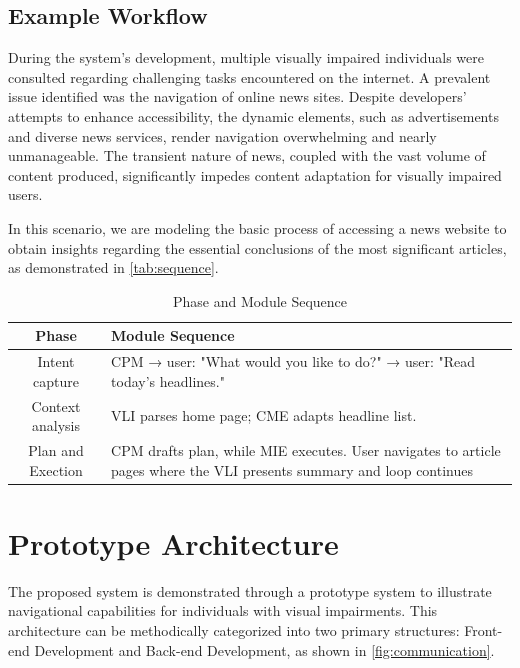 \documentclass[conference]{IEEEtran}
\begin{document}
\subsection*{Example Workflow}

During the system's development, multiple visually impaired individuals were consulted regarding challenging tasks encountered on the internet. A prevalent issue identified was the navigation of online news sites. Despite developers' attempts to enhance accessibility, the dynamic elements, such as advertisements and diverse news services, render navigation overwhelming and nearly unmanageable. The transient nature of news, coupled with the vast volume of content produced, significantly impedes content adaptation for visually impaired users. 

In this scenario, we are modeling the basic process of accessing a news website to obtain insights regarding the essential conclusions of the most significant articles, as demonstrated in \autoref{tab:sequence}.

\vfill
\begin{table}[h]
\centering
\caption{Phase and Module Sequence}
\label{tab:sequence}
\footnotesize
\renewcommand{\arraystretch}{2}
\begin{tabular}{|c|p{5.5cm}|}
\hline
\textbf{Phase} & \textbf{Module Sequence} \\
\hline
Intent capture & CPM → user: "What would you like to do?" → user: "Read today's headlines." \\
\hline
Context analysis & VLI parses home page; CME adapts headline list. \\
\hline
Plan and Exection & CPM drafts plan, while MIE executes. User navigates to article pages where the VLI presents summary and loop continues\\
\hline
\end{tabular}
\vspace{0.5cm}
\end{table}

\section{Prototype Architecture}\label{methodology}

The proposed system is demonstrated through a prototype system to illustrate navigational capabilities for individuals with visual impairments. This architecture can be methodically categorized into two primary structures: Front-end Development and Back-end Development, as shown in \autoref{fig:communication}.
\end{document}
